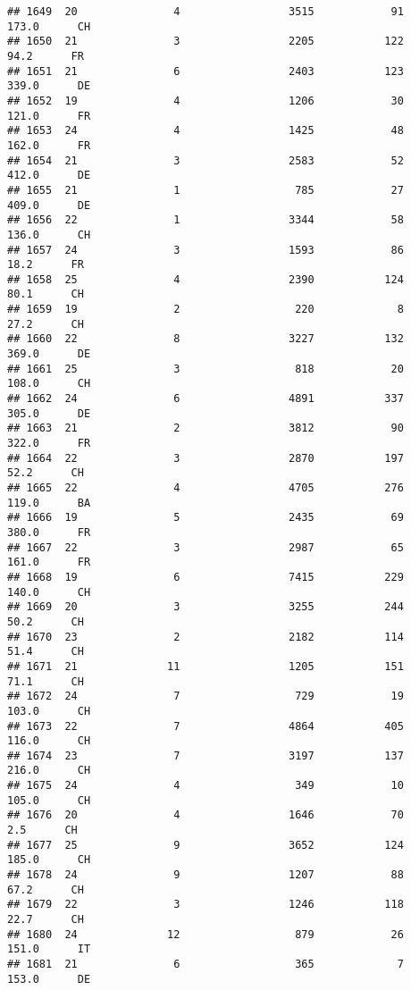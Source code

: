 \documentclass[
]{article}
\begin{document}
\begin{verbatim}
## 1649  20               4                 3515            91    173.0      CH
## 1650  21               3                 2205           122     94.2      FR
## 1651  21               6                 2403           123    339.0      DE
## 1652  19               4                 1206            30    121.0      FR
## 1653  24               4                 1425            48    162.0      FR
## 1654  21               3                 2583            52    412.0      DE
## 1655  21               1                  785            27    409.0      DE
## 1656  22               1                 3344            58    136.0      CH
## 1657  24               3                 1593            86     18.2      FR
## 1658  25               4                 2390           124     80.1      CH
## 1659  19               2                  220             8     27.2      CH
## 1660  22               8                 3227           132    369.0      DE
## 1661  25               3                  818            20    108.0      CH
## 1662  24               6                 4891           337    305.0      DE
## 1663  21               2                 3812            90    322.0      FR
## 1664  22               3                 2870           197     52.2      CH
## 1665  22               4                 4705           276    119.0      BA
## 1666  19               5                 2435            69    380.0      FR
## 1667  22               3                 2987            65    161.0      FR
## 1668  19               6                 7415           229    140.0      CH
## 1669  20               3                 3255           244     50.2      CH
## 1670  23               2                 2182           114     51.4      CH
## 1671  21              11                 1205           151     71.1      CH
## 1672  24               7                  729            19    103.0      CH
## 1673  22               7                 4864           405    116.0      CH
## 1674  23               7                 3197           137    216.0      CH
## 1675  24               4                  349            10    105.0      CH
## 1676  20               4                 1646            70      2.5      CH
## 1677  25               9                 3652           124    185.0      CH
## 1678  24               9                 1207            88     67.2      CH
## 1679  22               3                 1246           118     22.7      CH
## 1680  24              12                  879            26    151.0      IT
## 1681  21               6                  365             7    153.0      DE

\end{verbatim}
\end{document}
